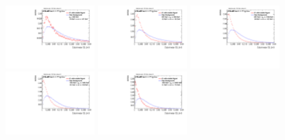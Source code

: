 \begin{figure}
\includegraphics[width=0.3\textwidth]{sascha_input/Appendix/Distributions/higgs/distributions/beta3/h_recoJet_C2_3_bin1.pdf} \hspace{1mm}
\includegraphics[width=0.3\textwidth]{sascha_input/Appendix/Distributions/higgs/distributions/beta3/h_recoJet_C2_3_bin2.pdf} \hspace{4mm}
\includegraphics[width=0.3\textwidth]{sascha_input/Appendix/Distributions/higgs/distributions/beta3/h_recoJet_C2_3_bin3.pdf} 
\bigskip
\includegraphics[width=0.3\textwidth]{sascha_input/Appendix/Distributions/higgs/distributions/beta3/h_recoJet_C2_3_bin4.pdf} \hspace{4mm}
\includegraphics[width=0.3\textwidth]{sascha_input/Appendix/Distributions/higgs/distributions/beta3/h_recoJet_C2_3_bin5.pdf} 


\end{figure}

